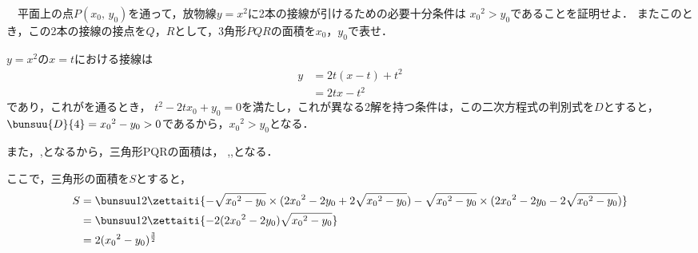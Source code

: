 \begin{problem}
　平面上の点$P(x_0, \, y_0)$を通って，放物線$y=x^2$に2本の接線が引けるための必要十分条件は
${x_0}^2>y_0$であることを証明せよ．
またこのとき，この2本の接線の接点を$Q$，$R$として，3角形$PQR$の面積を$x_0$，$y_0$で表せ．
\end{problem}

\noindent\kaie

$y = x^2$の$x=t$における接線は
\begin{align*}
  y &= 2t(x-t) + t^2 \\
  &= 2tx - t^2
\end{align*}
であり，これがを通るとき，
$t^2 - 2tx_0 + y_0 = 0$を満たし，これが異なる2解を持つ条件は，この二次方程式の判別式を$D$とすると，
$\bunsuu{D}{4} = {x_0}^2 - y_0 >0$であるから，${x_0}^2 > y_0$となる．

また，,となるから，三角形PQRの面積は，
,,となる．

ここで，三角形の面積を$S$とすると，
\begin{align*}
  S &= \bunsuu12 \zettaiti{-\sqrt{{x_0}^2-y_0}\times (2{x_0}^2-2y_0+2\sqrt{{x_0}^2-y_0}) - \sqrt{{x_0}^2-y_0} \times
  (2{x_0}^2-2y_0-2\sqrt{{x_0}^2-y_0})} \\
  &= \bunsuu12 \zettaiti{-2(2{x_0}^2-2y_0) \sqrt{{x_0}^2-y_0}} \\
  &= 2 ({x_0}^2 - y_0)^{\frac32}
\end{align*}

